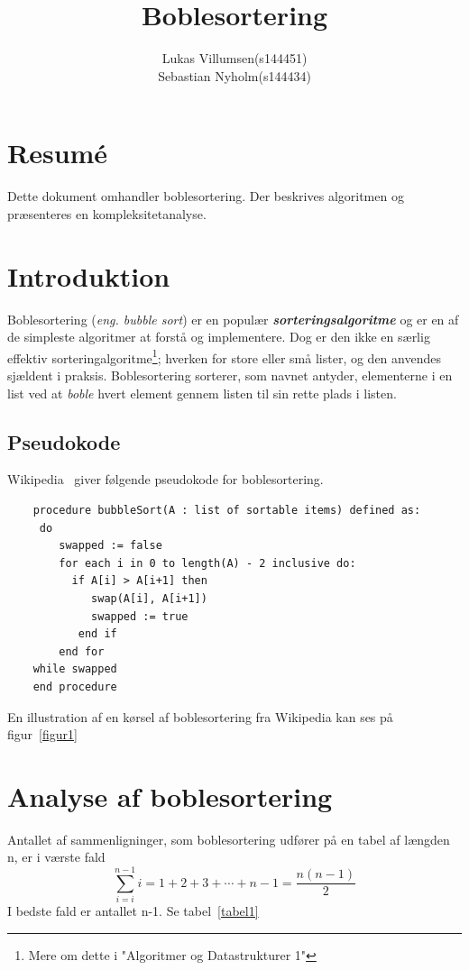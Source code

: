 \documentclass{article}
\title{Boblesortering}
\author{
	\begin{tabular}{l r}
		Lukas Villumsen & (s144451)\\
		Sebastian Nyholm & (s144434)\\
	\end{tabular}
}
\begin{document}
\maketitle

\section*{Resumé}
	Dette dokument omhandler boblesortering. Der beskrives algoritmen og præsenteres en kompleksitetanalyse.

\section{Introduktion}
	Boblesortering (\textit{eng. bubble sort}) er en populær \emph{\textbf{sorteringsalgoritme}} og er en af de simpleste algoritmer at forstå og implementere. Dog er den ikke en særlig effektiv sorteringalgoritme\footnote{Mere om dette i "Algoritmer og Datastrukturer 1"}; hverken for store eller små lister, og den anvendes sjældent i praksis. Boblesortering sorterer, som navnet antyder, elementerne i en list ved at \emph{boble} hvert element gennem listen til sin rette plads i listen.

\subsection{Pseudokode}
	Wikipedia~\cite{wiki} giver følgende pseudokode for boblesortering.

	\begin{verbatim}
	procedure bubbleSort(A : list of sortable items) defined as:
  	 do
     	swapped := false
     	for each i in 0 to length(A) - 2 inclusive do:
     	  if A[i] > A[i+1] then 
    	     swap(A[i], A[i+1])
    	     swapped := true
    	   end if
     	end for
   	while swapped
	end procedure

	\end{verbatim}
	En illustration af en kørsel af boblesortering fra Wikipedia kan ses på figur~\ref{figur1}

\section{Analyse af boblesortering}
	Antallet af sammenligninger, som boblesortering udfører på en tabel af længden n, er i værste fald
	\[\sum_{i=i}^{n-1}i=1+2+3+\cdots+n-1=\frac{n(n-1)}{2}\]
	I bedste fald er antallet n-1. Se tabel~\ref{tabel1}
\end{document}
